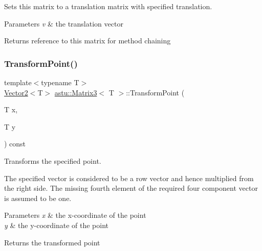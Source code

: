 Sets this matrix to a translation matrix with specified translation.


\begin{DoxyParams}{Parameters}
{\em v} & the translation vector \\
\hline
\end{DoxyParams}
\begin{DoxyReturn}{Returns}
reference to this matrix for method chaining 
\end{DoxyReturn}
\mbox{\label{classastu_1_1Matrix3_a5a241d1002dbf9cb9505f314d9ed92ff}} 
\subsubsection{\texorpdfstring{Transform\+Point()}{TransformPoint()}\hspace{0.1cm}{\footnotesize\ttfamily [1/2]}}
{\footnotesize\ttfamily template$<$typename T$>$ \\
\hyperlink{classastu_1_1Vector2}{Vector2}$<$T$>$ \hyperlink{classastu_1_1Matrix3}{astu\+::\+Matrix3}$<$ T $>$\+::Transform\+Point (\begin{DoxyParamCaption}\item[{T}]{x,  }\item[{T}]{y }\end{DoxyParamCaption}) const\hspace{0.3cm}{\ttfamily [inline]}}

Transforms the specified point.

The specified vector is considered to be a row vector and hence multiplied from the right side. The missing fourth element of the required four component vector is assumed to be one.


\begin{DoxyParams}{Parameters}
{\em x} & the x-\/coordinate of the point \\
\hline
{\em y} & the y-\/coordinate of the point \\
\hline
\end{DoxyParams}
\begin{DoxyReturn}{Returns}
the transformed point 
\end{DoxyReturn}
\mbox{\label{classastu_1_1Matrix3_a3e2c8ac9bae632e01f29dfc06fdf32dd}} 
